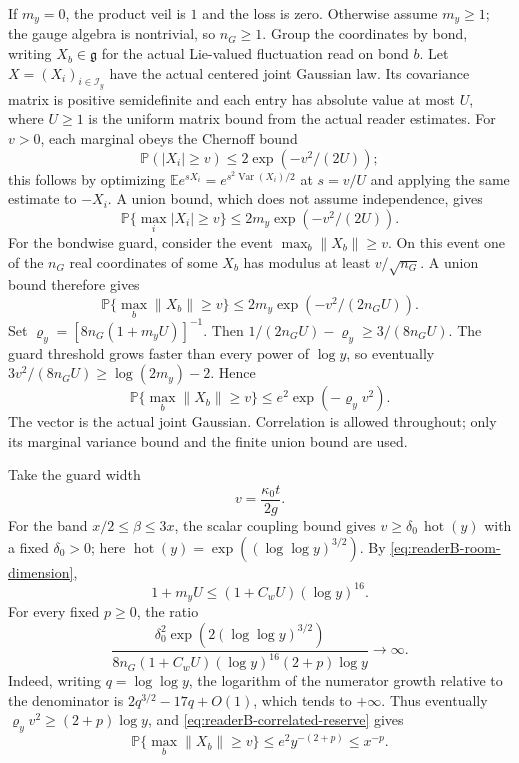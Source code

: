 If $m_y=0$, the product veil is $1$ and the loss is zero. Otherwise assume
$m_y\geq1$; the gauge algebra is nontrivial, so $n_G\geq1$. Group the
coordinates by bond, writing $X_b\in\mathfrak g$ for the actual Lie-valued
fluctuation read on bond $b$. Let $X=(X_i)_{i\in\mathcal I_y}$
have the actual centered joint Gaussian law. Its covariance matrix is
positive semidefinite and each entry has
absolute value at most $U$, where $U\geq1$ is the uniform matrix bound from
the actual reader estimates. For $v>0$, each marginal obeys the Chernoff
bound
\[
 \mathbb P(|X_i|\geq v)\leq2\exp(-v^2/(2U));
\]
this follows by optimizing
$\mathbb E e^{sX_i}=e^{s^2\operatorname{Var}(X_i)/2}$ at $s=v/U$ and
applying the same estimate to $-X_i$. A union bound, which does not assume
independence, gives
\[
 \mathbb P\{\max_i|X_i|\geq v\}
       \leq2m_y\exp(-v^2/(2U)).
\]
For the bondwise guard, consider the event $\max_b\|X_b\|\ge v$.
On this event one of the $n_G$ real coordinates of some $X_b$
has modulus at least $v/\sqrt{n_G}$. A union bound therefore
gives
\[
 \mathbb P\{\max_b\|X_b\|\geq v\}
       \leq2m_y\exp(-v^2/(2n_GU)).
\]
Set $\varrho_y=[8n_G(1+m_yU)]^{-1}$. Then
$1/(2n_GU)-\varrho_y\geq3/(8n_GU)$. The guard threshold grows faster than
every power of $\log y$, so eventually
$3v^2/(8n_GU)\geq\log(2m_y)-2$. Hence
\begin{equation}\label{eq:readerB-correlated-reserve}
 \mathbb P\{\max_b\|X_b\|\geq v\}
       \leq e^2\exp(-\varrho_y v^2).
\end{equation}
The vector is the actual joint Gaussian. Correlation is allowed throughout;
only its marginal variance bound and the finite union bound are used.

Take the guard width
\[
 v=\frac{\kappa_0 t}{2g}.
\]
For the band $x/2\leq\beta\leq3x$, the scalar coupling bound gives
$v\geq\delta_0\,\operatorname{hot}(y)$ with a fixed $\delta_0>0$;
here $\operatorname{hot}(y)=\exp((\log\log y)^{3/2})$. By
\eqref{eq:readerB-room-dimension},
\[
 1+m_yU\leq (1+C_wU)(\log y)^{16}.
\]
For every fixed $p\geq0$, the ratio
\[
 \frac{\delta_0^2\exp(2(\log\log y)^{3/2})}
      {8n_G(1+C_wU)(\log y)^{16}(2+p)\log y}
\longrightarrow\infty.
\]
Indeed, writing $q=\log\log y$, the logarithm of the numerator growth
relative to the denominator is $2q^{3/2}-17q+O(1)$, which tends to
$+\infty$. Thus eventually
$\varrho_y v^2\geq(2+p)\log y$, and
\eqref{eq:readerB-correlated-reserve} gives
\begin{equation}\label{eq:readerB-tail-power}
 \mathbb P\{\max_b\|X_b\|\geq v\}
       \leq e^2 y^{-(2+p)}\leq x^{-p}.
\end{equation}

